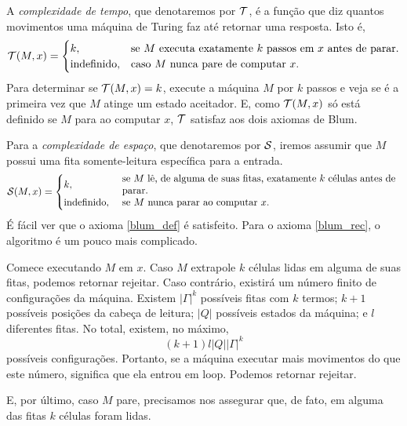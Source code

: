 \begin{example}
    A \emph{complexidade de tempo},
    que denotaremos por ${\mathcal{T}}$,
    é a função que diz quantos movimentos
    uma máquina de Turing faz até retornar uma resposta.
    Isto é,
    \begin{equation*}
        {\mathcal{T}}(M, x) = \begin{cases}
            k, & \text{se $M$ executa exatamente $k$ passos em $x$ antes de parar.} \\
            \text{indefinido}, & \text{caso $M$ nunca pare de computar $x$.}
        \end{cases}
    \end{equation*}
    Para determinar se ${\mathcal{T}}(M, x) = k$,
    execute a máquina $M$ por $k$ passos
    e veja se é a primeira vez que
    $M$ atinge um estado aceitador.
    E, como ${\mathcal{T}}(M, x)$ só está definido se $M$ para ao computar $x$,
    ${\mathcal{T}}$ satisfaz aos dois axiomas de Blum.
\end{example}

\begin{example}
    Para a \emph{complexidade de espaço},
    que denotaremos por ${\mathcal{S}}$,
    iremos assumir que $M$ possui uma fita somente-leitura
    específica para a entrada.
    \begin{equation*}
        \PhiDS(M, x) = \begin{cases}
            k, & \text{
                \parbox{0.8\textwidth}{%
                    se $M$ lê, de alguma de suas fitas,
                    exatamente $k$ células
                    antes de parar.
                }
            } \\
            \text{indefinido}, & \text{
                \parbox{0.8\textwidth}{
                    se $M$ nunca parar ao computar $x$.
                }
            }
        \end{cases}
    \end{equation*}
    É fácil ver que o axioma \ref{blum_def} é satisfeito.
    Para o axioma \ref{blum_rec},
    o algoritmo é um pouco mais complicado.

    Comece executando $M$ em $x$.
    Caso $M$ extrapole $k$ células lidas
    em alguma de suas fitas,
    podemos retornar rejeitar.
    Caso contrário,
    existirá um número finito de configurações da máquina.
    Existem $|\Gamma|^k$ possíveis fitas com $k$ termos;
    $k+1$ possíveis posições da cabeça de leitura;
    $|Q|$ possíveis estados da máquina;
    e $l$ diferentes fitas.
    No total, existem, no máximo,
    \begin{equation*}
        (k+1) l |Q||\Gamma|^k
    \end{equation*}
    possíveis configurações.
    Portanto, se a máquina executar
    mais movimentos do que este número,
    significa que ela entrou em loop.
    Podemos retornar rejeitar.

    E, por último,
    caso $M$ pare,
    precisamos nos assegurar que,
    de fato,
    em alguma das fitas $k$ células foram lidas.
\end{example}

